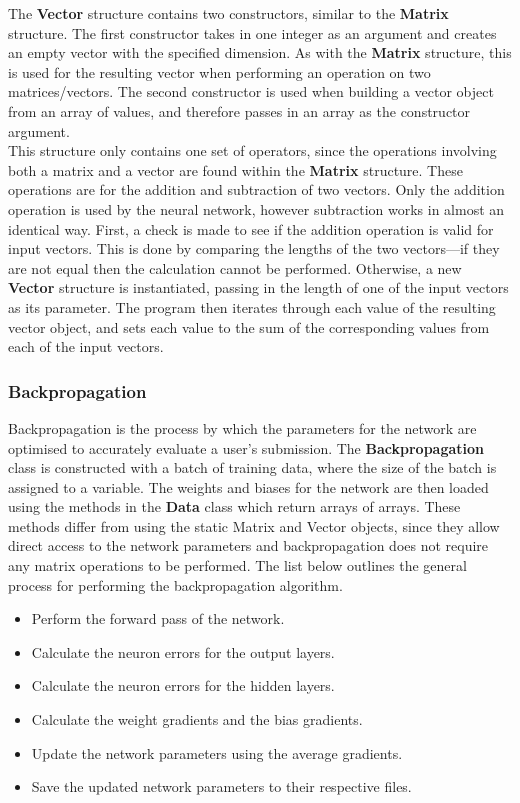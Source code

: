 \documentclass{article}
\begin{document}
The \textbf{Vector} structure contains two constructors, similar to the \textbf{Matrix} structure. The first constructor takes in one integer as an argument and creates an empty vector with the specified dimension. As with the \textbf{Matrix} structure, this is used for the resulting vector when performing an operation on two matrices/vectors. The second constructor is used when building a vector object from an array of values, and therefore passes in an array as the constructor argument. \\

This structure only contains one set of operators, since the operations involving both a matrix and a vector are found within the \textbf{Matrix} structure. These operations are for the addition and subtraction of two vectors. Only the addition operation is used by the neural network, however subtraction works in almost an identical way. First, a check is made to see if the addition operation is valid for input vectors. This is done by comparing the lengths of the two vectors---if they are not equal then the calculation cannot be performed. Otherwise, a new \textbf{Vector} structure is instantiated, passing in the length of one of the input vectors as its parameter. The program then iterates through each value of the resulting vector object, and sets each value to the sum of the corresponding values from each of the input vectors.

\subsubsection{Backpropagation}

Backpropagation is the process by which the parameters for the network are optimised to accurately evaluate a user's submission. The \textbf{Backpropagation} class is constructed with a batch of training data, where the size of the batch is assigned to a variable. The weights and biases for the network are then loaded using the methods in the \textbf{Data} class which return arrays of arrays. These methods differ from using the static Matrix and Vector objects, since they allow direct access to the network parameters and backpropagation does not require any matrix operations to be performed. The list below outlines the general process for performing the backpropagation algorithm.

\begin{itemize}
    \item Perform the forward pass of the network.
    \item Calculate the neuron errors for the output layers.
    \item Calculate the neuron errors for the hidden layers.
    \item Calculate the weight gradients and the bias gradients.
    \item Update the network parameters using the average gradients.
    \item Save the updated network parameters to their respective files.
\end{itemize}
\end{document}
